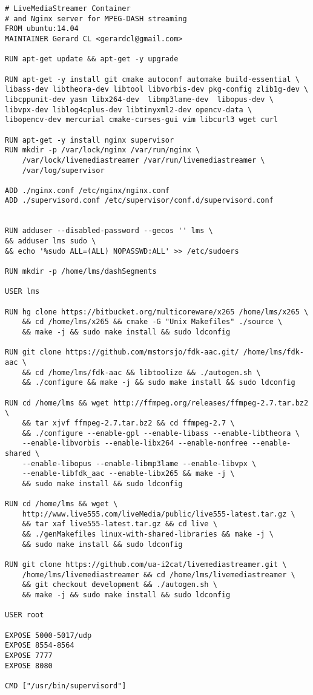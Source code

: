 \begin{verbatim}
# LiveMediaStreamer Container
# and Nginx server for MPEG-DASH streaming
FROM ubuntu:14.04
MAINTAINER Gerard CL <gerardcl@gmail.com>

RUN apt-get update && apt-get -y upgrade

RUN apt-get -y install git cmake autoconf automake build-essential \ 
libass-dev libtheora-dev libtool libvorbis-dev pkg-config zlib1g-dev \
libcppunit-dev yasm libx264-dev  libmp3lame-dev  libopus-dev \
libvpx-dev liblog4cplus-dev libtinyxml2-dev opencv-data \
libopencv-dev mercurial cmake-curses-gui vim libcurl3 wget curl 

RUN apt-get -y install nginx supervisor
RUN mkdir -p /var/lock/nginx /var/run/nginx \
	/var/lock/livemediastreamer /var/run/livemediastreamer \
	/var/log/supervisor

ADD ./nginx.conf /etc/nginx/nginx.conf
ADD ./supervisord.conf /etc/supervisor/conf.d/supervisord.conf


RUN adduser --disabled-password --gecos '' lms \
&& adduser lms sudo \
&& echo '%sudo ALL=(ALL) NOPASSWD:ALL' >> /etc/sudoers

RUN mkdir -p /home/lms/dashSegments

USER lms

RUN hg clone https://bitbucket.org/multicoreware/x265 /home/lms/x265 \
	&& cd /home/lms/x265 && cmake -G "Unix Makefiles" ./source \
	&& make -j && sudo make install && sudo ldconfig

RUN git clone https://github.com/mstorsjo/fdk-aac.git/ /home/lms/fdk-aac \
	&& cd /home/lms/fdk-aac && libtoolize && ./autogen.sh \
	&& ./configure && make -j && sudo make install && sudo ldconfig

RUN cd /home/lms && wget http://ffmpeg.org/releases/ffmpeg-2.7.tar.bz2 \
	&& tar xjvf ffmpeg-2.7.tar.bz2 && cd ffmpeg-2.7 \
	&& ./configure --enable-gpl --enable-libass --enable-libtheora \
	--enable-libvorbis --enable-libx264 --enable-nonfree --enable-shared \
	--enable-libopus --enable-libmp3lame --enable-libvpx \
	--enable-libfdk_aac --enable-libx265 && make -j \
	&& sudo make install && sudo ldconfig

RUN cd /home/lms && wget \
	http://www.live555.com/liveMedia/public/live555-latest.tar.gz \
	&& tar xaf live555-latest.tar.gz && cd live \
	&& ./genMakefiles linux-with-shared-libraries && make -j \
	&& sudo make install && sudo ldconfig

RUN git clone https://github.com/ua-i2cat/livemediastreamer.git \
	/home/lms/livemediastreamer && cd /home/lms/livemediastreamer \
	&& git checkout development && ./autogen.sh \
	&& make -j && sudo make install && sudo ldconfig

USER root

EXPOSE 5000-5017/udp
EXPOSE 8554-8564
EXPOSE 7777
EXPOSE 8080

CMD ["/usr/bin/supervisord"] 
\end{verbatim}

